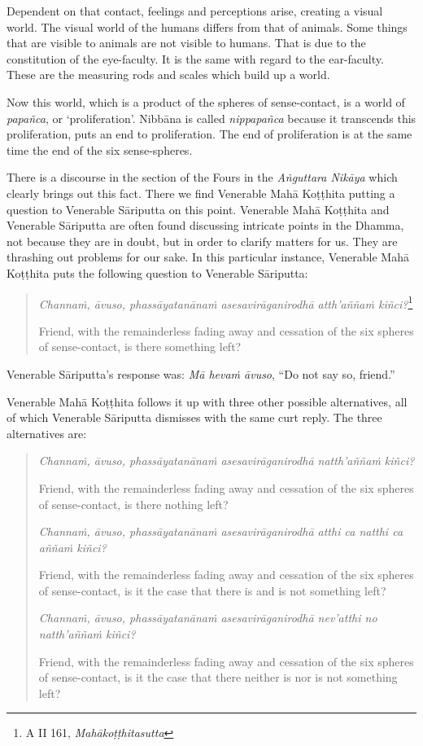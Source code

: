 Dependent on that contact, feelings and perceptions arise, creating a visual world. The visual world of the humans differs from that of animals. Some things that are visible to animals are not visible to humans. That is due to the constitution of the eye-faculty. It is the same with regard to the ear-faculty. These are the measuring rods and scales which build up a world.

Now this world, which is a product of the spheres of sense-contact, is a world of \emph{papañca}, or `proliferation'. Nibbāna is called \emph{nippapañca} because it transcends this proliferation, puts an end to proliferation. The end of proliferation is at the same time the end of the six sense-spheres.

There is a discourse in the section of the Fours in the \emph{Aṅguttara Nikāya} which clearly brings out this fact. There we find Venerable Mahā Koṭṭhita putting a question to Venerable Sāriputta on this point. Venerable Mahā Koṭṭhita and Venerable Sāriputta are often found discussing intricate points in the Dhamma, not because they are in doubt, but in order to clarify matters for us. They are thrashing out problems for our sake. In this particular instance, Venerable Mahā Koṭṭhita puts the following question to Venerable Sāriputta:

\begin{quote}
\emph{Channaṁ, āvuso, phassāyatanānaṁ asesavirāganirodhā atth'aññaṁ kiñci?}\footnote{A II 161, \emph{Mahākoṭṭhitasutta}}

Friend, with the remainderless fading away and cessation of the six spheres of sense-contact, is there something left?
\end{quote}

Venerable Sāriputta's response was: \emph{Mā hevaṁ āvuso}, ``Do not say so, friend.''

Venerable Mahā Koṭṭhita follows it up with three other possible alternatives, all of which Venerable Sāriputta dismisses with the same curt reply. The three alternatives are:

\begin{quote}
\emph{Channaṁ, āvuso, phassāyatanānaṁ asesavirāganirodhā natth'aññaṁ kiñci?}

Friend, with the remainderless fading away and cessation of the six spheres of sense-contact, is there nothing left?

\emph{Channaṁ, āvuso, phassāyatanānaṁ asesavirāganirodhā atthi ca natthi ca aññaṁ kiñci?}

Friend, with the remainderless fading away and cessation of the six spheres of sense-contact, is it the case that there is and is not something left?

\emph{Channaṁ, āvuso, phassāyatanānaṁ asesavirāganirodhā nev'atthi no natth'aññaṁ kiñci?}

Friend, with the remainderless fading away and cessation of the six spheres of sense-contact, is it the case that there neither is nor is not something left?
\end{quote}

